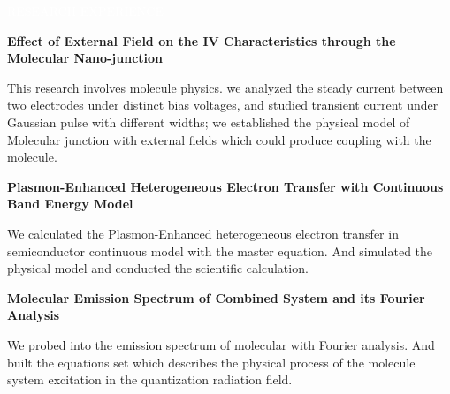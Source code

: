 \documentclass[12pt,a4paper,utf8]{report}
\begin{document}
\newpage
\begin{minipage}[t]{16cm}
    \begin{snugshade}{\textcolor{white}{\textsf{\quad 
        RESEARCH EXPERIENCE
    \qquad}}}\end{snugshade}
\end{minipage}\par
\vspace{0.2cm}\hspace{0.5cm}
\begin{minipage}[t]{15cm}
    {\textbf{Effect of External Field on the IV Characteristics through the Molecular Nano-junction}}\par
    \qquad\qquad\qquad\qquad\qquad{}\par
    \quad This research involves molecule physics. we analyzed the steady current between two electrodes under distinct bias voltages, and studied transient current under Gaussian pulse with different widths; we established the physical model of Molecular junction with external fields which could produce coupling with the molecule.\par
    \vspace{0.2cm}
    {\textbf{Plasmon-Enhanced Heterogeneous Electron Transfer with Continuous Band Energy Model}}\par
    \qquad\qquad\qquad\qquad\qquad{}\par
    \quad We calculated the Plasmon-Enhanced heterogeneous electron transfer in semiconductor continuous model with the master equation. And simulated the physical model and conducted the scientific calculation.\par
    \vspace{0.2cm}
    {\textbf{Molecular Emission Spectrum of Combined System and its Fourier Analysis}}\par
    \qquad\qquad\qquad\qquad\qquad{}\par
    \quad We probed into the emission spectrum of molecular with Fourier analysis. And built the equations set which describes the physical process of the molecule system excitation in the quantization radiation field.\par
\end{minipage}\par
\vspace{0.4cm}
\end{document}
